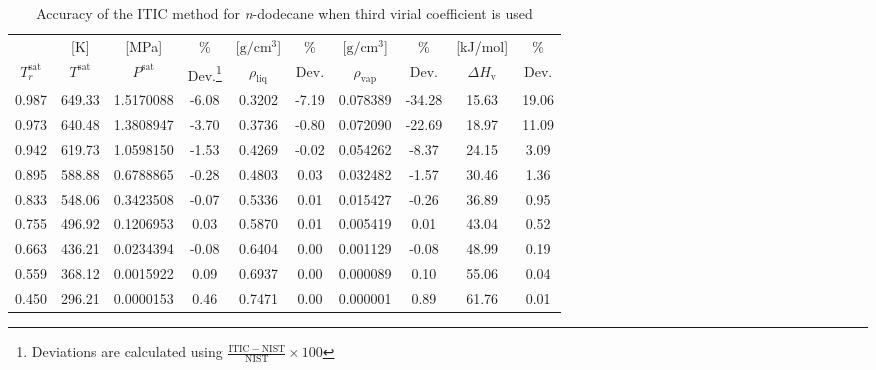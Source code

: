 \documentclass[5p,times]{elsarticle}
\begin{document}
\begin{table}[]
\centering
\caption{Accuracy of the ITIC method for \textit{n}-dodecane when third virial coefficient is used}
\label{tab:NIST-VAL-C12-FTT}
\begin{tabular}{cccccccccc}
 & {[}K{]} &	 {[}MPa{]} &	 \% 	& {[}$\mathrm{g/cm^3}${]} & \% & {[}$\mathrm{g/cm^3}${]} & \% 	& {[}kJ/mol{]} & \% \\
$T_r^{\mathrm{sat}}$ & $T^{\mathrm{sat}}$ & $P^{\mathrm{sat}}$ & Dev.\footnote{Deviations are calculated using $\frac{\mathrm{ITIC - NIST}}{\mathrm{NIST}} \times 100$} & $\rho_{\mathrm{liq}}$ &	 Dev. & $\rho_{\mathrm{vap}}$ & Dev. & $\Delta H_{\mathrm{v}}$ & Dev. \\
\hline
0.987 & 649.33    & 1.5170088 & -6.08   & 0.3202     & -7.19   & 0.078389        & -34.28  & 15.63        & 19.06   \\
0.973 & 640.48    & 1.3808947 & -3.70   & 0.3736     & -0.80   & 0.072090        & -22.69  & 18.97        & 11.09   \\
0.942 & 619.73    & 1.0598150 & -1.53   & 0.4269     & -0.02   & 0.054262        & -8.37   & 24.15        & 3.09    \\
0.895 & 588.88    & 0.6788865 & -0.28   & 0.4803     & 0.03    & 0.032482        & -1.57   & 30.46        & 1.36    \\
0.833 & 548.06    & 0.3423508 & -0.07   & 0.5336     & 0.01    & 0.015427        & -0.26   & 36.89        & 0.95    \\
0.755 & 496.92    & 0.1206953 & 0.03    & 0.5870     & 0.01    & 0.005419        & 0.01    & 43.04        & 0.52    \\
0.663 & 436.21    & 0.0234394 & -0.08   & 0.6404     & 0.00    & 0.001129        & -0.08   & 48.99        & 0.19    \\
0.559 & 368.12    & 0.0015922 & 0.09    & 0.6937     & 0.00    & 0.000089        & 0.10    & 55.06        & 0.04    \\
0.450 & 296.21    & 0.0000153 & 0.46    & 0.7471     & 0.00    & 0.000001        & 0.89    & 61.76        & 0.01    \\ 			
\end{tabular}

\end{table}
\end{document}
